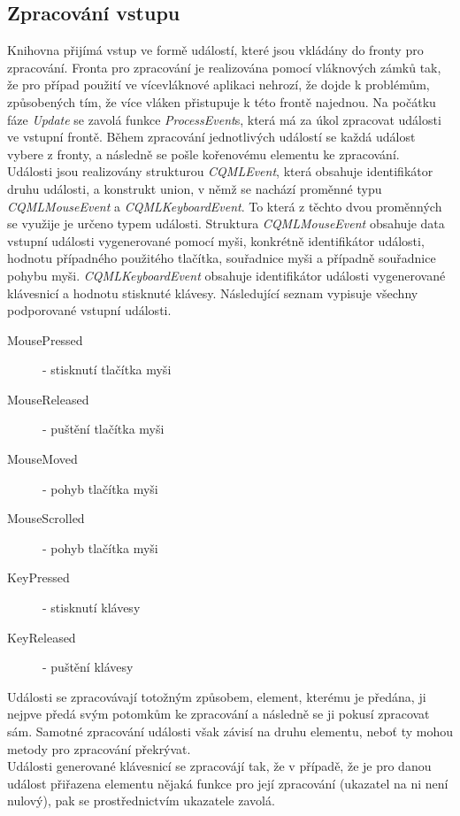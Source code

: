 \documentclass[11pt,twoside,a4paper]{book}
\begin{document}
\subsection{Zpracování vstupu}
Knihovna přijímá vstup ve formě událostí, které jsou vkládány do fronty pro zpracování. Fronta pro zpracování je realizována pomocí vláknových zámků tak, že pro případ použití ve vícevláknové aplikaci nehrozí, že dojde k problémům, způsobených tím, že více vláken přistupuje k této frontě najednou.
Na počátku fáze \textit{Update} se zavolá funkce \textit{ProcessEvent}s, která má za úkol zpracovat události ve vstupní frontě. Během zpracování jednotlivých událostí se každá událost vybere z fronty, a následně se pošle kořenovému elementu ke zpracování. \\
Události jsou realizovány strukturou \textit{CQMLEvent}, která obsahuje identifikátor druhu události, a konstrukt union, v němž se nachází proměnné typu \textit{CQMLMouseEvent} a \textit{CQMLKeyboardEvent}. To která z těchto dvou proměnných se využije je určeno typem události. Struktura \textit{CQMLMouseEvent} obsahuje data vstupní události vygenerované pomocí myši, konkrétně identifikátor události, hodnotu případného použitého tlačítka, souřadnice myši a případně souřadnice pohybu myši. \textit{CQMLKeyboardEvent} obsahuje identifikátor události vygenerované klávesnicí a hodnotu stisknuté klávesy. Následující seznam vypisuje všechny podporované vstupní události.
\begin{description}
\item[MousePressed] - stisknutí tlačítka myši
\item[MouseReleased] - puštění tlačítka myši
\item[MouseMoved] - pohyb tlačítka myši
\item[MouseScrolled] - pohyb tlačítka myši
\item[KeyPressed] - stisknutí klávesy
\item[KeyReleased] - puštění klávesy
\end{description}
Události se zpracovávají totožným způsobem, element, kterému je předána, ji nejpve předá svým potomkům ke zpracování a následně se ji pokusí zpracovat sám. Samotné zpracování události však závisí na druhu elementu, neboť ty mohou metody pro zpracování překrývat. \\
Události generované klávesnicí se zpracovájí tak, že v případě, že je pro danou událost přiřazena elementu nějaká funkce pro její zpracování (ukazatel na ni není nulový), pak se prostřednictvím ukazatele zavolá.\\
\end{document}
